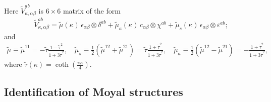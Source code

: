 \documentclass[a4paper,12pt]{article}
\begin{document}
Here $\tilde{V}^{ab}_{\kappa,\alpha\beta}$ is $6\times 6$ matrix of the form
\begin{gather}
\tilde{V}^{ab}_{\kappa,\alpha\beta}=
\tilde{\mu}(\kappa)\,\epsilon_{\alpha\beta}\otimes\delta^{ab}
+\tilde{\mu}_a(\kappa)\,c_{\alpha\beta}\otimes\chi^{ab}
+\tilde{\mu}_s(\kappa)\,\epsilon_{\alpha\beta}\otimes\varepsilon^{ab};
\end{gather}
and
\begin{gather}
\tilde{\mu}\equiv\tilde{\mu}^{11}
=-\tilde{\tau}\frac{1-\tilde{\tau}^{2}}{1+3\tilde{\tau}^2},\quad
\tilde{\mu}_{s}\equiv\frac12(\tilde{\mu}^{12}+\tilde{\mu}^{21})
=\tilde{\tau}\frac{1+\tilde{\tau}^{2}}{1+3\tilde{\tau}^2},\quad
\tilde{\mu}_{a}\equiv\frac12(\tilde{\mu}^{12}-\tilde{\mu}^{21})
=-\frac{1+\tilde{\tau}^{2}}{1+3\tilde{\tau}^2},
\end{gather}
where $\tilde{\tau}(\kappa)=\coth\left(\frac{\pi\kappa}{4}\right)$.

\subsection{Identification of Moyal structures}
\end{document}
